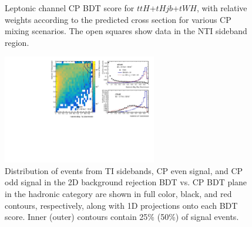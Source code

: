 \begin{figure}[htbp]
  \centering
  \caption{Leptonic channel CP BDT score for $ttH$+$tHjb$+$tWH$, with relative weights according to the predicted cross section for various CP mixing scenarios.  The open squares show data in the NTI sideband region. }
  \label{fig:cplep}
\end{figure}

\begin{figure}[htbp]
 \centering
  	\includegraphics[width=0.6\textwidth]{figures/tthcp_chapter/categorization_xgb/BDTdist_had_zero.pdf}
  \caption{Distribution of events from TI sidebands, CP even signal, and CP odd signal in the 2D background rejection BDT vs. CP BDT plane in the hadronic category are shown in full color, black, and red contours, respectively, along with 1D projections onto each BDT score. Inner (outer) contours contain 25\% (50\%) of signal events.}
  \label{fig:2dbdthad}
\end{figure}

